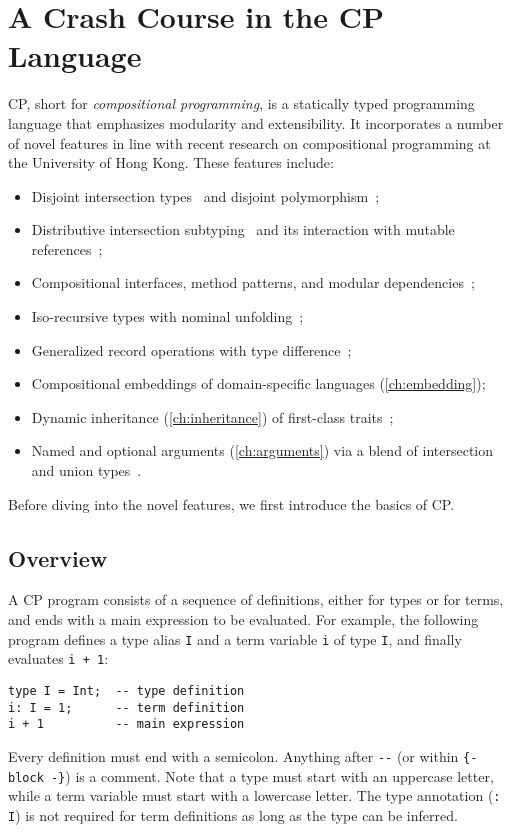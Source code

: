\chapter{A Crash Course in the CP Language} \label{ch:cp}

CP, short for \emph{compositional programming}, is a statically typed
programming language that emphasizes modularity and extensibility. It
incorporates a number of novel features in line with recent research on
compositional programming at the University of Hong Kong. These features
include:
\begin{itemize}
\item Disjoint intersection types~\citep{oliveira2016disjoint} and disjoint
      polymorphism~\citep{alpuim2017disjoint,xie2020row};
\item Distributive intersection subtyping~\citep{bi2018essence,bi2019distributive}
      and its interaction with mutable references~\citep{ye2024imperative};
\item Compositional interfaces, method patterns, and modular
      dependencies~\citep{zhang2021compositional};
\item Iso-recursive types with nominal unfolding~\citep{zhou2022calculus};
\item Generalized record operations with type difference~\citep{xu2023making};
\item Compositional embeddings of domain-specific languages
      (\autoref{ch:embedding});
\item Dynamic inheritance (\autoref{ch:inheritance}) of first-class
      traits~\citep{bi2018typed};
\item Named and optional arguments (\autoref{ch:arguments}) via a blend of
      intersection and union types~\citep{rehman2023blend}.
\end{itemize}
Before diving into the novel features, we first introduce the basics of CP.

\section{Overview}

A CP program consists of a sequence of definitions, either for types or for
terms, and ends with a main expression to be evaluated. For example, the
following program defines a type alias \lstinline{I} and a term variable
\lstinline{i} of type \lstinline{I}, and finally evaluates \lstinline{i + 1}:
\begin{lstlisting}[xleftmargin=.3\textwidth]
type I = Int;  -- type definition
i: I = 1;      -- term definition
i + 1          -- main expression
\end{lstlisting}
Every definition must end with a semicolon.
Anything after \lstinline{--} (or within \lstinline|{- block -}|) is a comment.
Note that a type must start with an uppercase letter, while a term variable must
start with a lowercase letter. The type annotation (\lstinline{: I}) is not
required for term definitions as long as the type can be inferred.

